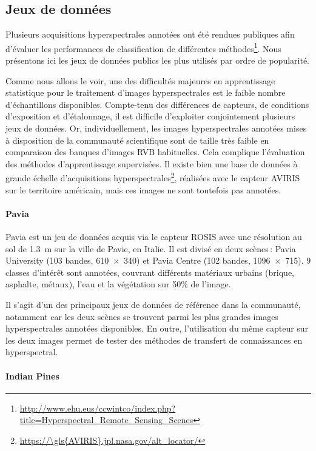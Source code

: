 \subsection{Jeux de données}
\label{sec:hyperspectral_datasets}

Plusieurs acquisitions hyperspectrales annotées ont été rendues publiques afin d'évaluer les performances de classification de différentes méthodes\footnote{\url{http://www.ehu.eus/ccwintco/index.php?title=Hyperspectral_Remote_Sensing_Scenes}}. Nous présentons ici les jeux de données publics les plus utilisés par ordre de popularité.

Comme nous allons le voir, une des difficultés majeures en apprentissage statistique pour le traitement d'images hyperspectrales est le faible nombre d'échantillons disponibles. Compte-tenu des différences de capteurs, de conditions d'exposition et d'étalonnage, il est difficile d'exploiter conjointement plusieurs jeux de données. Or, individuellement, les images hyperspectrales annotées mises à disposition de la communauté scientifique sont de taille très faible en comparaison des banques d'images \gls{RVB} habituelles. Cela complique l'évaluation des méthodes d'apprentissage supervisées. Il existe bien une base de données à grande échelle d'acquisitions hyperspectrales\footnote{\url{https://\gls{AVIRIS}.jpl.nasa.gov/alt_locator/}}, réalisées avec le capteur \gls{AVIRIS} sur le territoire américain, mais ces images ne sont toutefois pas annotées.

\paragraph{Pavia}

Pavia est un jeu de données acquis via le capteur ROSIS avec une résolution au sol de \SI{1,3}{\meter} sur la ville de Pavie, en Italie. Il est divisé en deux scènes\,: Pavia University (103 bandes, \SI{610x340}{\px}) et Pavia Centre (102 bandes, \SI{1096x715}{\px}). 9 classes d'intérêt sont annotées, couvrant différents matériaux urbains (brique, asphalte, métaux), l'eau et la végétation sur 50\% de l'image.

Il s'agit d'un des principaux jeux de données de référence dans la communauté, notamment car les deux scènes se trouvent parmi les plus grandes images hyperspectrales annotées disponibles. En outre, l'utilisation du même capteur sur les deux images permet de tester des méthodes de transfert de connaissances en hyperspectral.

\paragraph{Indian Pines}

